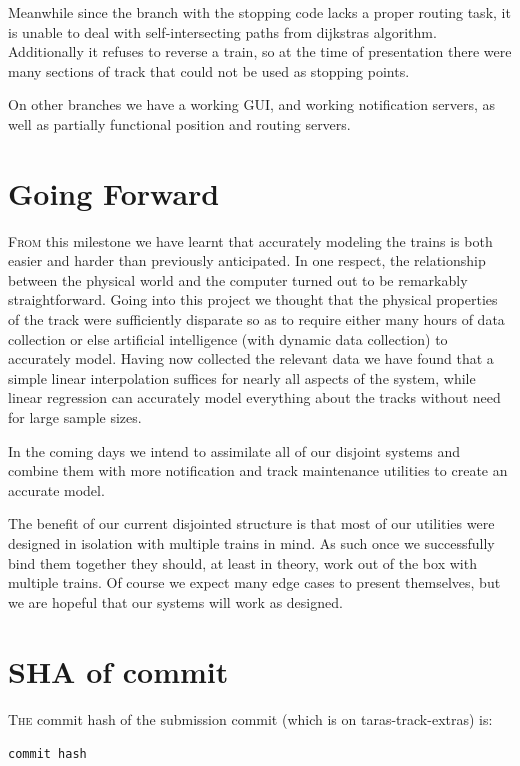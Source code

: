 \documentclass{amsart} \usepackage{amsmath} \usepackage{upgreek}
\begin{document}
Meanwhile since the branch with the stopping code lacks a proper routing task,
it is unable to deal with self-intersecting paths from dijkstras algorithm.
Additionally it refuses to reverse a train, so at the time of presentation there
were many sections of track that could not be used as stopping points.

On other branches we have a working GUI, and working notification servers, as
well as partially functional position and routing servers.

\clearpage

\section*{Going Forward}

\textsc{From} this milestone we have learnt that accurately modeling the trains
is both easier and harder than previously anticipated. In one respect, the
relationship between the physical world and the computer turned out to be
remarkably straightforward. Going into this project we thought that the physical
properties of the track were sufficiently disparate so as to require either many
hours of data collection or else artificial intelligence (with dynamic data
collection) to accurately model. Having now collected the relevant data we have
found that a simple linear interpolation suffices for nearly all aspects of the
system, while linear regression can accurately model everything about the tracks
without need for large sample sizes.

In the coming days we intend to assimilate all of our disjoint systems and
combine them with more notification and track maintenance utilities to create an
accurate model.

The benefit of our current disjointed structure is that most of our utilities
were designed in isolation with multiple trains in mind. As such once we
successfully bind them together they should, at least in theory, work out of the
box with multiple trains. Of course we expect many edge cases to present
themselves, but we are hopeful that our systems will work as designed.

\section*{SHA of commit}

\textsc{The} commit hash of the submission commit (which is on
taras-track-extras) is:

\texttt{{{{commit hash}}}}
\end{document}
